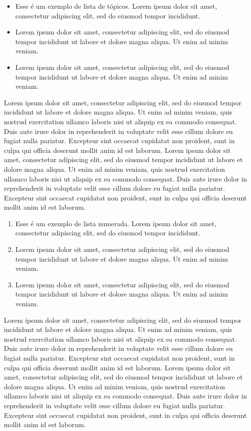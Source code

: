 \begin{itemize}
\item Esse é um exemplo de lista de tópicos. Lorem ipsum dolor sit amet, consectetur adipiscing elit, sed do eiusmod tempor incididunt.
\item Lorem ipsum dolor sit amet, consectetur adipiscing elit, sed do eiusmod tempor incididunt ut labore et dolore magna aliqua. Ut enim ad minim veniam.
\item Lorem ipsum dolor sit amet, consectetur adipiscing elit, sed do eiusmod tempor incididunt ut labore et dolore magna aliqua. Ut enim ad minim veniam.
\end{itemize}

Lorem ipsum dolor sit amet, consectetur adipiscing elit, sed do eiusmod tempor incididunt ut labore et dolore magna aliqua. Ut enim ad minim veniam, quis nostrud exercitation ullamco laboris nisi ut aliquip ex ea commodo consequat. Duis aute irure dolor in reprehenderit in voluptate velit esse cillum dolore eu fugiat nulla pariatur. Excepteur sint occaecat cupidatat non proident, sunt in culpa qui officia deserunt mollit anim id est laborum. Lorem ipsum dolor sit amet, consectetur adipiscing elit, sed do eiusmod tempor incididunt ut labore et dolore magna aliqua. Ut enim ad minim veniam, quis nostrud exercitation ullamco laboris nisi ut aliquip ex ea commodo consequat. Duis aute irure dolor in reprehenderit in voluptate velit esse cillum dolore eu fugiat nulla pariatur. Excepteur sint occaecat cupidatat non proident, sunt in culpa qui officia deserunt mollit anim id est laborum.

\begin{enumerate}%
\item Esse é um exemplo de lista numerada. Lorem ipsum dolor sit amet, consectetur adipiscing elit, sed do eiusmod tempor incididunt.
\item Lorem ipsum dolor sit amet, consectetur adipiscing elit, sed do eiusmod tempor incididunt ut labore et dolore magna aliqua. Ut enim ad minim veniam.
\item Lorem ipsum dolor sit amet, consectetur adipiscing elit, sed do eiusmod tempor incididunt ut labore et dolore magna aliqua. Ut enim ad minim veniam.
\end{enumerate}

Lorem ipsum dolor sit amet, consectetur adipiscing elit, sed do eiusmod tempor incididunt ut labore et dolore magna aliqua. Ut enim ad minim veniam, quis nostrud exercitation ullamco laboris nisi ut aliquip ex ea commodo consequat. Duis aute irure dolor in reprehenderit in voluptate velit esse cillum dolore eu fugiat nulla pariatur. Excepteur sint occaecat cupidatat non proident, sunt in culpa qui officia deserunt mollit anim id est laborum. Lorem ipsum dolor sit amet, consectetur adipiscing elit, sed do eiusmod tempor incididunt ut labore et dolore magna aliqua. Ut enim ad minim veniam, quis nostrud exercitation ullamco laboris nisi ut aliquip ex ea commodo consequat. Duis aute irure dolor in reprehenderit in voluptate velit esse cillum dolore eu fugiat nulla pariatur. Excepteur sint occaecat cupidatat non proident, sunt in culpa qui officia deserunt mollit anim id est laborum.

